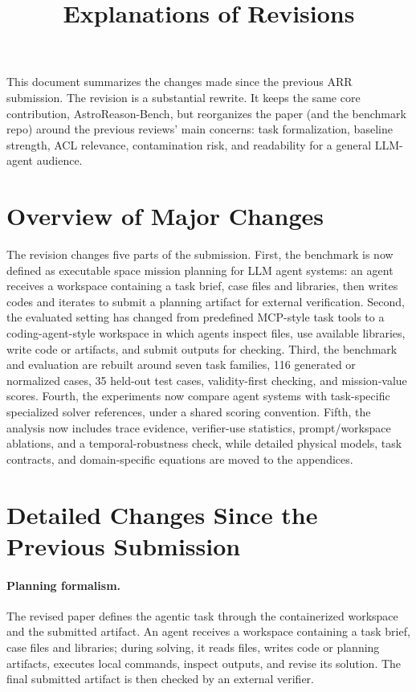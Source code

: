 \documentclass[11pt]{article}
\title{Explanations of Revisions}
\author{}
\date{}
\begin{document}
\maketitle

This document summarizes the changes made since the previous ARR submission. The revision is a substantial rewrite. It keeps the same core contribution, AstroReason-Bench, but reorganizes the paper (and the benchmark repo) around the previous reviews' main concerns: task formalization, baseline strength, ACL relevance, contamination risk, and readability for a general LLM-agent audience.

\section*{Overview of Major Changes}

The revision changes five parts of the submission. First, the benchmark is now defined as executable space mission planning for LLM agent systems: an agent receives a workspace containing a task brief, case files and libraries, then writes codes and iterates to submit a planning artifact for external verification. Second, the evaluated setting has changed from predefined MCP-style task tools to a coding-agent-style workspace in which agents inspect files, use available libraries, write code or artifacts, and submit outputs for checking. Third, the benchmark and evaluation are rebuilt around seven task families, 116 generated or normalized cases, 35 held-out test cases, validity-first checking, and mission-value scores. Fourth, the experiments now compare agent systems with task-specific specialized solver references, under a shared scoring convention. Fifth, the analysis now includes trace evidence, verifier-use statistics, prompt/workspace ablations, and a temporal-robustness check, while detailed physical models, task contracts, and domain-specific equations are moved to the appendices.

\section*{Detailed Changes Since the Previous Submission}

\paragraph{Planning formalism.}
The revised paper defines the agentic task through the containerized workspace and the submitted artifact. An agent receives a workspace containing a task brief, case files and libraries; during solving, it reads files, writes code or planning artifacts, executes local commands, inspect outputs, and revise its solution. The final submitted artifact is then checked by an external verifier.
\end{document}
